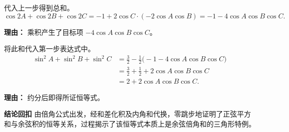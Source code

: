 \begin{proofbox}
\begin{description}[style=nextline, leftmargin=2.8em, labelsep=0.5em, itemsep=0.55em]
    \item[\textbf{步骤五（合并结果）：}] 代入上一步得到总和。
    \[
    \cos 2A+\cos 2B+\cos 2C = -1 + 2\cos C \cdot (-2\cos A\cos B) = -1 - 4\cos A\cos B\cos C.
    \]
    \par\textbf{理由：} 乘积产生了目标项 $-4\cos A\cos B\cos C$。

    \item[\textbf{步骤六（回代原式）：}] 将此和代入第一步表达式中。
    \[
    \begin{aligned}
    \sin^2 A+\sin^2 B+\sin^2 C &= \frac{3}{2} - \frac{1}{2}\bigl(-1 - 4\cos A\cos B\cos C\bigr) \\
    &= \frac{3}{2} + \frac{1}{2} + 2\cos A\cos B\cos C \\
    &= 2 + 2\cos A\cos B\cos C.
    \end{aligned}
    \]
    \par\textbf{理由：} 约分后即得所证恒等式。
\end{description}

\medskip
\textbf{\textcolor{CProof}{结论回扣}}  由倍角公式出发，经和差化积及内角和代换，零跳步地证明了正弦平方和与余弦积的恒等关系，过程揭示了该恒等式本质上是余弦倍角和的三角形特例。
\end{proofbox}
